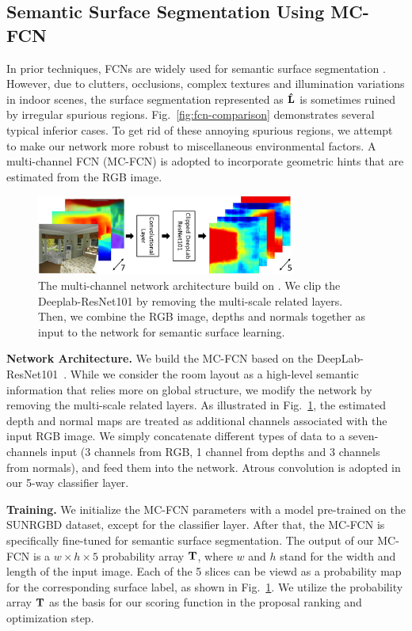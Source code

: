 \subsection{Semantic Surface Segmentation Using MC-FCN}
\label{sec:surfacelabel}
In prior techniques, FCNs are widely used for semantic surface segmentation \cite{dasgupta2016delay,ren2016coarse,mallya2015learning}. 
%
However, due to clutters, occlusions, complex textures and illumination variations in indoor scenes, the surface segmentation represented as $\mathbf{\hat{L}}$ is sometimes ruined by irregular spurious regions. 
Fig.~\ref{fig:fcn-comparison} demonstrates several typical inferior cases.
%
To get rid of these annoying spurious regions, we attempt to make our network more robust to miscellaneous environmental factors. 
A multi-channel FCN (MC-FCN) is adopted to incorporate geometric hints that are estimated from the RGB image. 
%


\begin{figure}
	\centering
	\includegraphics[width=8.5cm]{figure/MC-FCN.png}
	\caption{The multi-channel network architecture build on \cite{chen2016deeplab}. We clip the Deeplab-ResNet101 by removing the multi-scale related layers. Then, we combine the RGB image, depths and normals together as input to the network for semantic surface learning. }
	\label{fig:fcn-multi-channel}
\end{figure}

\vspace{0.1cm}
\noindent\textbf{Network Architecture.}
We build the MC-FCN based on the DeepLab-ResNet101~\cite{chen2016deeplab}. 
%
While we consider the room layout as a high-level semantic information that relies more on global structure, we modify the network by removing the multi-scale related layers. 
As illustrated in Fig.~\ref{fig:fcn-multi-channel}, the estimated depth and normal maps are treated as additional channels associated with the input RGB image. 
We simply concatenate different types of data to a seven-channels input (3 channels from RGB, 1 channel from depths and 3 channels from normals), and feed them into the network. 
Atrous convolution is adopted in our 5-way classifier layer. 

\vspace{0.1cm}
\noindent\textbf{Training.} We initialize the MC-FCN parameters with a model pre-trained on the SUNRGBD dataset, except for the classifier layer. 
After that, the MC-FCN is specifically fine-tuned for semantic surface segmentation.
%
The output of our MC-FCN is a $w\times h \times 5$ probability array $\mathbf{T}$, where $w$ and $h$ stand for the width and length of the input image. Each of the 5 slices can be viewd as a probability map for the corresponding surface label, as shown in Fig.~\ref{fig:fcn-multi-channel}. We utilize the probability array $\mathbf{T}$ as the basis for our scoring function in the proposal ranking and optimization step. 
 


